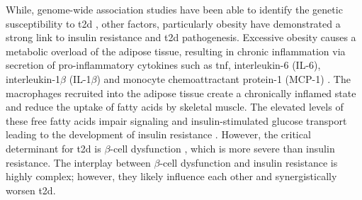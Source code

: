 While, genome-wide association studies have been able to identify the genetic susceptibility to \gls{t2d} \textbf{\cite{grarup_genetic_2014, wang_genetic_2016}}, other factors, particularly obesity have demonstrated a strong link to insulin resistance and \gls{t2d} pathogenesis. Excessive obesity causes a metabolic overload of the adipose tissue, resulting in chronic inflammation via secretion of pro-inflammatory cytokines such as \gls{tnf}, interleukin-6 (IL-6), interleukin-1$\beta$ (IL-1$\beta$) and monocyte chemoattractant protein-1 (MCP-1) \textbf{\cite{guilherme_adipocyte_2008}}. The macrophages recruited into the adipose tissue create a chronically inflamed state and reduce the uptake of fatty acids by skeletal muscle. The elevated levels of these free fatty acids impair signaling and insulin-stimulated glucose transport leading to the development of insulin resistance \textbf{\cite{unger_lipotoxicity_1995,uysal_protection_1997,kanda_mcp-1_2006}}. However, the critical determinant for \gls{t2d} is $\beta$-cell dysfunction \textbf{\cite{tahrani_glycaemic_2010, khin_pancreatic_2023}}, which is more severe than insulin resistance. The interplay between $\beta$-cell dysfunction and insulin resistance is highly complex; however, they likely influence each other and synergistically worsen \gls{t2d}.\\  


